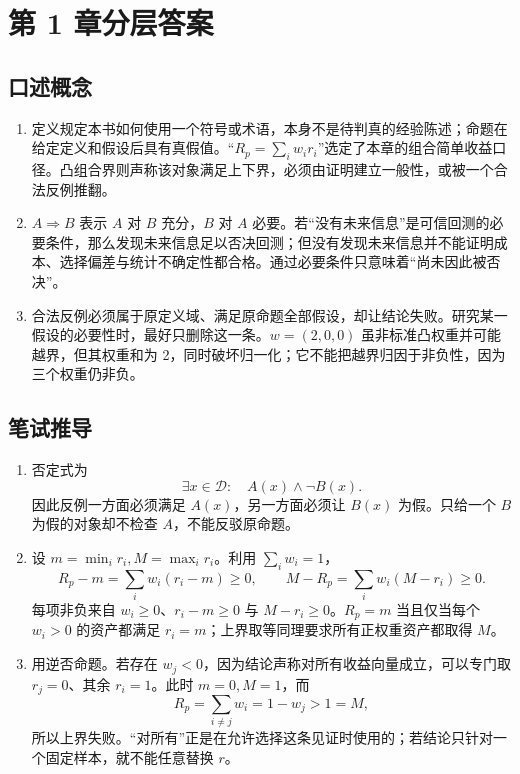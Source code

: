 \chapter{第 1 章分层答案}
\label{app:ch01-solutions}

\section*{口述概念}
\begin{enumerate}[leftmargin=*]
  \item 定义规定本书如何使用一个符号或术语，本身不是待判真的经验陈述；命题在给定定义和假设后具有真假值。“$R_p=\sum_iw_ir_i$”选定了本章的组合简单收益口径。凸组合界则声称该对象满足上下界，必须由证明建立一般性，或被一个合法反例推翻。
  \item $A\Rightarrow B$ 表示 $A$ 对 $B$ 充分，$B$ 对 $A$ 必要。若“没有未来信息”是可信回测的必要条件，那么发现未来信息足以否决回测；但没有发现未来信息并不能证明成本、选择偏差与统计不确定性都合格。通过必要条件只意味着“尚未因此被否决”。
  \item 合法反例必须属于原定义域、满足原命题全部假设，却让结论失败。研究某一假设的必要性时，最好只删除这一条。$w=(2,0,0)$ 虽非标准凸权重并可能越界，但其权重和为 2，同时破坏归一化；它不能把越界归因于非负性，因为三个权重仍非负。
\end{enumerate}

\section*{笔试推导}
\begin{enumerate}[leftmargin=*]
  \item 否定式为
  \[
    \exists x\in\mathcal D:\quad A(x)\land\neg B(x).
  \]
  因此反例一方面必须满足 $A(x)$，另一方面必须让 $B(x)$ 为假。只给一个 $B$ 为假的对象却不检查 $A$，不能反驳原命题。
  \item 设 $m=\min_i r_i,M=\max_i r_i$。利用 $\sum_iw_i=1$，
  \[
    R_p-m=\sum_iw_i(r_i-m)\geq0,
    \qquad
    M-R_p=\sum_iw_i(M-r_i)\geq0.
  \]
  每项非负来自 $w_i\geq0$、$r_i-m\geq0$ 与 $M-r_i\geq0$。$R_p=m$ 当且仅当每个 $w_i>0$ 的资产都满足 $r_i=m$；上界取等同理要求所有正权重资产都取得 $M$。
  \item 用逆否命题。若存在 $w_j<0$，因为结论声称对所有收益向量成立，可以专门取 $r_j=0$、其余 $r_i=1$。此时 $m=0,M=1$，而
  \[
    R_p=\sum_{i\ne j}w_i=1-w_j>1=M,
  \]
  所以上界失败。“对所有”正是在允许选择这条见证时使用的；若结论只针对一个固定样本，就不能任意替换 $r$。
\end{enumerate}

